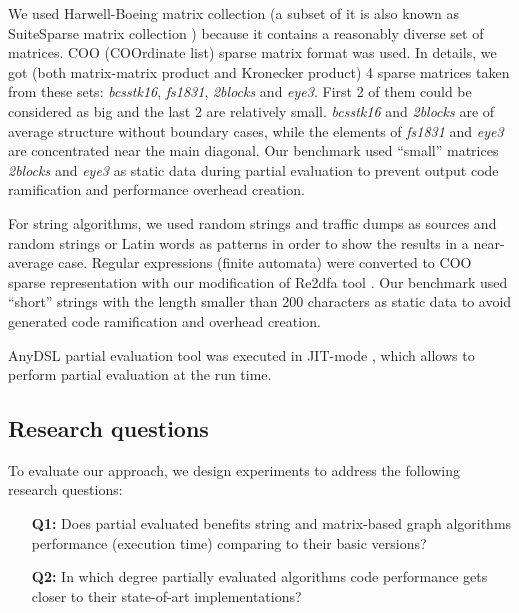 \documentclass[conference]{IEEEtran}
\begin{document}
We used Harwell-Boeing matrix collection \cite{duff1992users} (a subset of it is also known as SuiteSparse matrix collection \cite{davis2011university}) because it contains a reasonably diverse set of matrices. COO (COOrdinate list) sparse matrix format was used. In details, we got (both matrix-matrix product and Kronecker product) 4 sparse matrices taken from these sets: \textit{bcsstk16}, \textit{fs1831}, \textit{2blocks} and \textit{eye3}. First 2 of them could be considered as big and the last 2 are relatively small. \textit{bcsstk16} and \textit{2blocks} are of average structure without boundary cases, while  the elements of \textit{fs1831} and \textit{eye3} are concentrated near the main diagonal. Our benchmark used ``small'' matrices \textit{2blocks} and \textit{eye3} as static data during partial evaluation to prevent output code ramification and performance overhead creation.

For string algorithms, we used random strings and traffic dumps as sources and random strings or Latin words as patterns in order to show the results in a near-average case. Regular expressions (finite automata) were converted to COO sparse representation with our modification of Re2dfa tool \cite{re2dfa}. Our benchmark used ``short'' strings with the length smaller than 200 characters as static data to avoid generated code ramification and overhead creation.

AnyDSL partial evaluation tool was executed in JIT-mode \cite{leissa2018anydsl}, which allows to perform partial evaluation at the run time.



\subsection{Research questions}

To evaluate our approach, we design experiments to address the following research questions:

\begin{itemize}
	\item[\textbf{Q1:}] Does partial evaluated benefits string and matrix-based graph algorithms performance (execution time) comparing to their basic versions?
	\item[\textbf{Q2:}] In which degree partially evaluated algorithms code performance gets closer to their state-of-art implementations?
\end{itemize}
\end{document}
